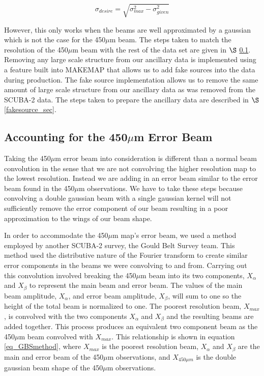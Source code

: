 \begin{equation}\label{eq:gaus_kern}
  \sigma_{desire} = \sqrt{\sigma_{max}^2 - \sigma_{given}^2}
\end{equation}

However, this only works when the beams are well approximated by a gaussian which is not the case for the 450$\mu$m beam.  The steps taken to match the resolution of the 450$\mu$m beam with the rest of the data set are given in $\S$ \ref{450_fix_sec}.  Removing any large scale structure from our ancillary data is implemented using a feature built into MAKEMAP that allows us to add fake sources into the data during production.  The fake source implementation allows us to remove the same amount of large scale structure from our ancillary data as was removed from the SCUBA-2 data.  The steps taken to prepare the ancillary data are described in $\S$\ref{fakesource_sec}.


\subsection{Accounting for the 450$\mu$m Error Beam}\label{450_fix_sec}

Taking the 450$\mu$m error beam into consideration is different than a normal beam convolution in the sense that we are not convolving the higher resolution map to the lowest resolution.  Instead we are adding in an error beam similar to the error beam found in the 450$\mu$m observations.  We have to take these steps because convolving a double gaussian beam with a single gaussian kernel will not sufficiently remove the error component of our beam resulting in a poor approximation to the wings of our beam shape.

In order to accommodate the 450$\mu$m map's error beam, we used a method employed by another SCUBA-2 survey, the Gould Belt Survey team.  This method used the distributive nature of the Fourier transform to create similar error components in the beams we were convolving to and from.  Carrying out this convolution involved breaking the 450$\mu$m beam into its two components, $X_{\alpha}$ and $X_{\beta}$ to represent the main beam and error beam.  The values of the main beam amplitude, $X_\alpha$, and error beam amplitude, $X_\beta$, will sum to one so the height of the total beam is normalized to one.  The poorest resolution beam, $X_{max}$, is convolved with the two components $X_\alpha$ and $X_\beta$ and the resulting beams are added together.  This process produces an equivalent two component beam as the 450$\mu$m beam convolved with $X_{max}$.  This relationship is shown in equation \ref{eq_GBSmethod}, where $X_{max}$ is the poorest resolution beam, $X_{\alpha}$ and $X_{\beta}$ are the main and error beam of the 450$\mu$m observations, and $X_{450\mu m}$ is the double gaussian beam shape of the 450$\mu$m observations.

